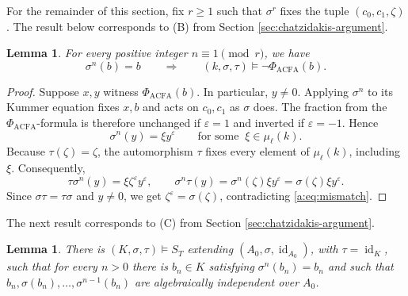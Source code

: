 \documentclass[10pt,a4paper]{amsart}
\renewcommand{\ge}{\geqslant}
\newtheorem{lemma}[theorem]{Lemma}
\theoremstyle{definition}
\DeclareMathOperator{\id}{id}
\begin{document}
For the remainder of this section, fix $r\ge1$ such that
$\sigma^r$ fixes the tuple $(c_0,c_1,\zeta)$. The result below corresponds to (B) from Section \ref{sec:chatzidakis-argument}.
\begin{lemma}\label{a:lem:obstruction}
For every positive integer $n\equiv1\pmod r$, we have
\[
\sigma^n(b)=b
\qquad\Longrightarrow\qquad
(k,\sigma,\tau)\models\neg\Phi_{\mathrm{ACFA}}(b).
\]
\end{lemma}

\begin{proof}
Suppose $x,y$ witness $\Phi_{\mathrm{ACFA}}(b)$. In particular, $y\neq0$. Applying $\sigma^n$ to its Kummer equation fixes $x,b$ and acts on $c_0,c_1$ as $\sigma$ does. The fraction from the $\Phi_{\mathrm{ACFA}}$-formula is therefore unchanged if $\varepsilon=1$ and inverted if $\varepsilon=-1$. Hence
\[
 \sigma^n(y)=\xi y^\varepsilon\qquad\text{for some }\ \xi\in\mu_\ell(k).
\]
Because $\tau(\zeta)=\zeta$, the automorphism $\tau$ fixes every element of $\mu_\ell(k)$, including $\xi$. Consequently,
\[
 \tau\sigma^n(y)=\xi\zeta^\varepsilon y^\varepsilon,\qquad
 \sigma^n\tau(y)=\sigma^n(\zeta)\xi y^\varepsilon
                 =\sigma(\zeta)\xi y^\varepsilon.
\]
Since $\sigma\tau=\tau\sigma$ and $y\neq0$, we get $\zeta^\varepsilon=\sigma(\zeta)$, contradicting \eqref{a:eq:mismatch}.
\end{proof}
The next result corresponds to (C) from Section \ref{sec:chatzidakis-argument}.
\begin{lemma}\label{a:lem:obstruction_exists}
There is $(K,\sigma,\tau)\models S_T$ extending
$(A_0,\sigma,\id_{A_0})$, with $\tau=\id_K$, such that
for every $n>0$ there is $b_n\in K$ satisfying
$\sigma^n(b_n)=b_n$ and such that
$b_n,\sigma(b_n),\ldots,\sigma^{n-1}(b_n)$
are algebraically independent over $A_0$.
\end{lemma}
\end{document}
